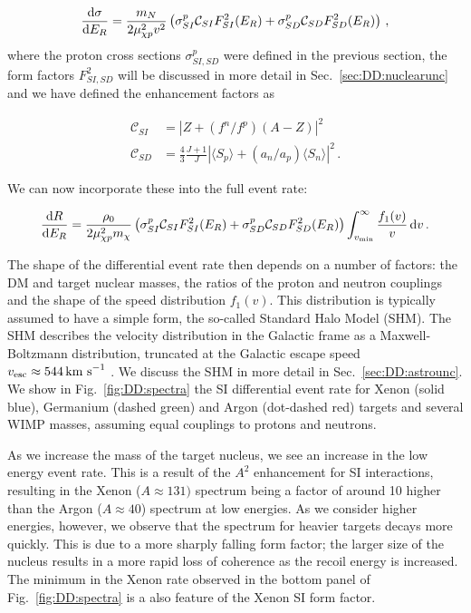 \begin{equation}
\label{eq:DD:fullsigma}
\frac{\mathrm{d}\sigma}{\mathrm{d}E_R} = \frac{m_N}{2 \mu_{\chi p}^2 v^2} \left( \sigma_{SI}^p \mathcal{C}_{SI} F_{SI}^2(E_R) + \sigma_{SD}^p \mathcal{C}_{SD} F_{SD}^2(E_R) \right)\,,
\end{equation}
where the proton cross sections $\sigma_{SI,SD}^p$ were defined in the previous section, the form factors $F_{SI,SD}^2$ will be discussed in more detail in Sec.~\ref{sec:DD:nuclearunc} and we have defined the enhancement factors as

\begin{align}
\mathcal{C}_{SI} &= \left|Z + (f^n/f^p) (A-Z)\right|^2 \\
\mathcal{C}_{SD} &= \frac{4}{3}\frac{J+1}{J} \left| \langle S_p \rangle + (a_n/a_p) \langle S_n \rangle \right|^2\,.
\end{align}

We can now incorporate these into the full event rate:

\begin{equation}
\frac{\mathrm{d}R}{\mathrm{d}E_R} = \frac{\rho_0}{2 \mu_{\chi p}^2 m_\chi}\left( \sigma_{SI}^p \mathcal{C}_{SI} F_{SI}^2(E_R) + \sigma_{SD}^p \mathcal{C}_{SD} F_{SD}^2(E_R) \right) \int_{v_\textrm{min}}^\infty \frac{f_1(v)}{v}\,\mathrm{d}v\,.
\end{equation}

The shape of the differential event rate then depends on a number of factors: the DM and target nuclear masses, the ratios of the proton and neutron couplings and the shape of the speed distribution $f_1(v)$. This distribution is typically assumed to have a simple form, the so-called Standard Halo Model (SHM). The SHM describes the velocity distribution in the Galactic frame as a Maxwell-Boltzmann distribution, truncated at the Galactic escape speed $v_\textrm{esc} \approx 544 \,\textrm{km s}^{-1}$ \cite{RAVE:2007, RAVE:2014}. We discuss the SHM in more detail in Sec.~\ref{sec:DD:astrounc}. We show in Fig.~\ref{fig:DD:spectra} the SI differential event rate for Xenon (solid blue), Germanium (dashed green) and Argon (dot-dashed red) targets and several WIMP masses, assuming equal couplings to protons and neutrons.

As we increase the mass of the target nucleus, we see an increase in the low energy event rate. This is a result of the $A^2$ enhancement for SI interactions, resulting in the Xenon ($A \approx 131)$ spectrum being a factor of around 10 higher than the Argon ($A \approx 40$) spectrum at low energies. As we consider higher energies, however, we observe that the spectrum for heavier targets decays more quickly. This is due to a more sharply falling form factor; the larger size of the nucleus results in a more rapid loss of coherence as the recoil energy is increased. The minimum in the Xenon rate observed in the bottom panel of Fig.~\ref{fig:DD:spectra} is a also feature of the Xenon SI form factor.

